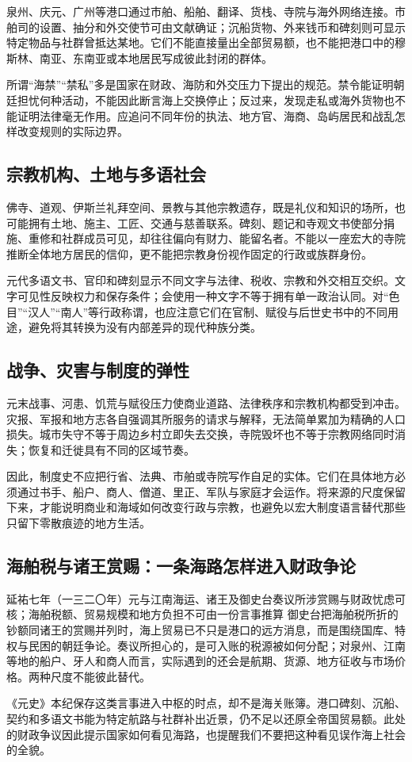 泉州、庆元、广州等港口通过市舶、船舶、翻译、货栈、寺院与海外网络连接。市舶司的设置、抽分和外交使节可由文献确证；沉船货物、外来钱币和碑刻则可显示特定物品与社群曾抵达某地。它们不能直接量出全部贸易额，也不能把港口中的穆斯林、南亚、东南亚或本地居民写成彼此封闭的群体。

所谓“海禁”“禁私”多是国家在财政、海防和外交压力下提出的规范。禁令能证明朝廷担忧何种活动，不能因此断言海上交换停止；反过来，发现走私或海外货物也不能证明法律毫无作用。应追问不同年份的执法、地方官、海商、岛屿居民和战乱怎样改变规则的实际边界。

\subsection{宗教机构、土地与多语社会}

佛寺、道观、伊斯兰礼拜空间、景教与其他宗教遗存，既是礼仪和知识的场所，也可能拥有土地、施主、工匠、交通与慈善联系。碑刻、题记和寺观文书使部分捐施、重修和社群成员可见，却往往偏向有财力、能留名者。不能以一座宏大的寺院推断全体地方居民的信仰，更不能把宗教身份视作固定的行政或族群身份。

元代多语文书、官印和碑刻显示不同文字与法律、税收、宗教和外交相互交织。文字可见性反映权力和保存条件；会使用一种文字不等于拥有单一政治认同。对“色目”“汉人”“南人”等行政称谓，也应注意它们在官制、赋役与后世史书中的不同用途，避免将其转换为没有内部差异的现代种族分类。

\subsection{战争、灾害与制度的弹性}

元末战事、河患、饥荒与赋役压力使商业道路、法律秩序和宗教机构都受到冲击。灾报、军报和地方志各自强调其所服务的请求与解释，无法简单累加为精确的人口损失。城市失守不等于周边乡村立即失去交换，寺院毁坏也不等于宗教网络同时消失；恢复和迁徙具有不同的区域节奏。

因此，制度史不应把行省、法典、市舶或寺院写作自足的实体。它们在具体地方必须通过书手、船户、商人、僧道、里正、军队与家庭才会运作。将来源的尺度保留下来，才能说明商业和海域如何改变行政与宗教，也避免以宏大制度语言替代那些只留下零散痕迹的地方生活。

\subsection{海舶税与诸王赏赐：一条海路怎样进入财政争论}
\begin{event}{}{延祐七年（一三二〇年）}{元与江南海运、诸王及御史台}{奏议所涉赏赐与财政忧虑可核；海舶税额、贸易规模和地方负担不可由一份言事推算}
御史台把海舶税所折的钞额同诸王的赏赐并列时，海上贸易已不只是港口的远方消息，而是围绕国库、特权与民困的朝廷争论。奏议所担心的，是可入账的税源被如何分配；对泉州、江南等地的船户、牙人和商人而言，实际遇到的还会是航期、货源、地方征收与市场价格。两种尺度不能彼此替代。

《元史》本纪保存这类言事进入中枢的时点，却不是海关账簿。港口碑刻、沉船、契约和多语文书能为特定航路与社群补出近景，仍不足以还原全帝国贸易额。此处的财政争议因此提示国家如何看见海路，也提醒我们不要把这种看见误作海上社会的全貌。
\end{event}